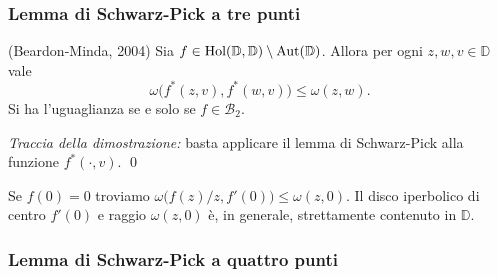 \begin{frame}
  \frametitle{Lemma di Schwarz-Pick a tre punti}
  \begin{thm}
    (Beardon-Minda, 2004) Sia $f \in \text{\normalfont{Hol}}(\mathbb{D},\mathbb{D})\setminus\text{\normalfont{Aut}}(\mathbb{D})$. Allora per ogni $z, w, v \in \mathbb{D}$ vale
    \begin{equation}
      \omega\bigl(f^*(z,v),f^*(w,v)\bigr) \le \omega(z,w).
    \end{equation}
    Si ha l'uguaglianza se e solo se $f \in \mathcal{B}_2$.
  \end{thm}
  \pause
  \textit{Traccia della dimostrazione:} basta applicare il lemma di Schwarz-Pick alla funzione $f^*(\cdot,v)$. \qed
  \pause
  \begin{oss}
    Se $f(0)=0$ troviamo $\omega\bigl(f(z)/z,f'(0)\bigr) \le \omega(z,0)$. Il disco iperbolico di centro $f'(0)$ e raggio $\omega(z,0)$ è, in generale, strettamente contenuto in $\mathbb{D}$.
  \end{oss}
\end{frame}

\begin{frame}[t]
  \frametitle{Lemma di Schwarz-Pick a quattro punti}
  \pause
  \pause
\end{frame}

